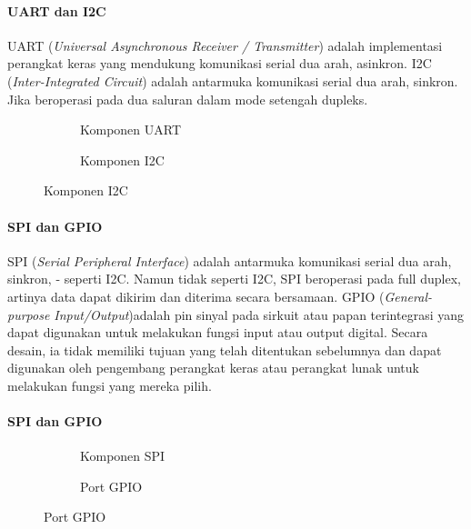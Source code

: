 \begin{frame}{\insertsectionhead}
	\framesubtitle{UART dan I2C}
	\justifying
	UART (\textit{Universal Asynchronous Receiver / Transmitter}) adalah implementasi perangkat keras yang mendukung komunikasi serial dua arah, asinkron.
	\vfill
	I2C (\textit{Inter-Integrated Circuit}) adalah antarmuka komunikasi serial dua arah, sinkron. Jika beroperasi pada dua saluran dalam mode setengah dupleks.
		\begin{figure}[ht!]
		\begin{subfigure}[b]{0.25\textwidth}
			\caption*{Komponen UART}
		\end{subfigure}
		\hspace{50pt}
		\begin{subfigure}[b]{0.25\textwidth}
			\caption*{Komponen I2C}
		\end{subfigure}
	\end{figure}
\end{frame}

\begin{frame}{\insertsectionhead}
	\framesubtitle{SPI dan GPIO}
	\justifying
	SPI (\textit{Serial Peripheral Interface}) adalah antarmuka komunikasi serial dua arah, sinkron, - seperti I2C. Namun tidak seperti I2C, SPI beroperasi pada full duplex, artinya data dapat dikirim dan diterima secara bersamaan.
	\vfill
	GPIO (\textit{General-purpose Input/Output})adalah pin sinyal pada sirkuit atau papan terintegrasi yang dapat digunakan untuk melakukan fungsi input atau output digital. Secara desain, ia tidak memiliki tujuan yang telah ditentukan sebelumnya dan dapat digunakan oleh pengembang perangkat keras atau perangkat lunak untuk melakukan fungsi yang mereka pilih.
\end{frame}

\begin{frame}{\insertsectionhead}
	\framesubtitle{SPI dan GPIO}
	\justifying
	\begin{figure}[ht!]
		\begin{subfigure}[b]{0.25\textwidth}
			\caption*{Komponen SPI}
		\end{subfigure}
		\hspace{50pt}
		\begin{subfigure}[b]{0.25\textwidth}
			\caption*{Port GPIO}
		\end{subfigure}
	\end{figure}
\end{frame}

